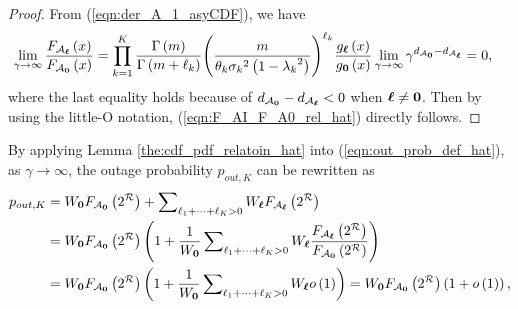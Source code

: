 \documentclass[12pt,onecolumn,draftcls]{IEEEtran}
\newcommand{\bs}{\boldsymbol}
\begin{document}
\begin{proof}
From (\ref{eqn:der_A_1_asyCDF}), we have
  \begin{align}\label{eqn:lemma2_proof}
\mathop {\lim }\limits_{\gamma  \to \infty } \frac{{{F_{{\mathcal A_{\bs \ell} }}}\left( x \right)}}{{{F_{{\mathcal A_{\bf{0}}}}}\left( x \right)}} %
 &= \prod\limits_{k = 1}^K {\frac{{\Gamma \left( m \right)}}{{\Gamma \left( {m + {\ell _k}} \right)}}{{\left( {\frac{m}{{{\theta _k}{\sigma _k}^2\left( {1 - {\lambda _k}^2} \right)}}} \right)}^{{\ell _k}}}} \frac{{{g_{\bs \ell} }\left( x \right)}}{{{g_{\bf{0}}}\left( x \right)}}\mathop {\lim }\limits_{\gamma  \to \infty } {\gamma ^{d_{{{\cal A}_{\bf 0} }} - {d_{{{\cal A}_{\bs \ell} }}}}} = 0,
\end{align}
where the last equality holds because of ${d_{{{\cal A}_{\bf 0} }} - {d_{{{\cal A}_{\bs \ell} }}}} < 0$ when $\bs \ell \ne \bf 0$. Then by using the little-O notation, (\ref{eqn:F_AI_F_A0_rel_hat}) directly follows.%
\end{proof}
By applying Lemma \ref{the:cdf_pdf_relatoin_hat} into (\ref{eqn:out_prob_def_hat}), as $\gamma \to \infty$, the outage probability ${p_{out,K}}$ can be rewritten as \begin{align}\label{eqn:cdf_F_shif_gam_pro_asy}
{p_{out,K}} &= {W_{\bf{0}}}{F_{{{ {\mathcal A}}_{\bf{0}}}}}\left( 2^{\mathcal R} \right) + \sum\nolimits_{{\ell_1} +  \cdots  + {\ell_K} > 0}  {{W_{\bs{\ell}}}{F_{{{ {\mathcal A}}_{\bs{\ell}}}}}\left( 2^{\mathcal R} \right)} \notag \\
&= {W_{\bf{0}}}{F_{{{ {\mathcal A}}_{\bf{0}}}}}\left( 2^{\mathcal R} \right)\left( {1 + \frac{1}{{{W_{\bf{0}}}}}\sum\nolimits_{{\ell_1} + \cdots  + {\ell_K} > 0}  {{W_{\bs{\ell}}}\frac{{{F_{{{ {\mathcal A}}_{\bs{\ell}}}}}\left( 2^{\mathcal R} \right)}}{{{F_{{{ {\mathcal A}}_{\bf{0}}}}}\left( 2^{\mathcal R} \right)}}} } \right)\notag\\
& = {W_{\bf{0}}}{F_{{{ {\mathcal A}}_{\bf{0}}}}}\left( 2^{\mathcal R} \right)\left( {1 + \frac{1}{{{W_{\bf{0}}}}}\sum\nolimits_{{\ell_1} +  \cdots  + {\ell_K} > 0}  {{W_{\bs{\ell}}}o\left( 1  \right)} } \right) = {W_{\bf{0}}}{F_{{{ {\mathcal A}}_{\bf{0}}}}}\left( 2^{\mathcal R} \right)\left( {1 + o\left( 1 \right)} \right),
\end{align}
\end{document}
